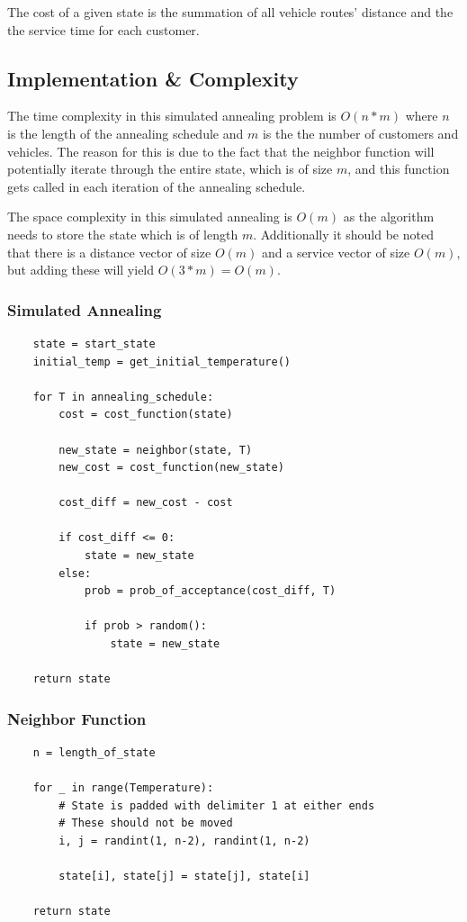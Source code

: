 \documentclass{article}
\begin{document}
The cost of a given state is the summation of all vehicle routes' distance and the the service time for each customer.

\subsection{Implementation \& Complexity}

The time complexity in this simulated annealing problem is $O(n*m)$ where $n$ is the length of the annealing schedule and $m$ is the the number of customers and vehicles. The reason for this is due to the fact that the neighbor function will potentially iterate through the entire state, which is of size $m$, and this function gets called in each iteration of the annealing schedule.

The space complexity in this simulated annealing is $O(m)$ as the algorithm needs to store the state which is of length $m$. Additionally it should be noted that there is a distance vector of size $O(m)$ and a service vector of size $O(m)$, but adding these will yield $O(3*m) = O(m)$.

\subsubsection{Simulated Annealing}

\begin{lstlisting}
    state = start_state
    initial_temp = get_initial_temperature()
    
    for T in annealing_schedule:
        cost = cost_function(state)

        new_state = neighbor(state, T)
        new_cost = cost_function(new_state)

        cost_diff = new_cost - cost

        if cost_diff <= 0:
            state = new_state
        else:
            prob = prob_of_acceptance(cost_diff, T)

            if prob > random():
                state = new_state
    
    return state
\end{lstlisting}

\subsubsection{Neighbor Function}

\begin{lstlisting}
    n = length_of_state

    for _ in range(Temperature):
        # State is padded with delimiter 1 at either ends
        # These should not be moved
        i, j = randint(1, n-2), randint(1, n-2)

        state[i], state[j] = state[j], state[i]

    return state
\end{lstlisting}
\end{document}
